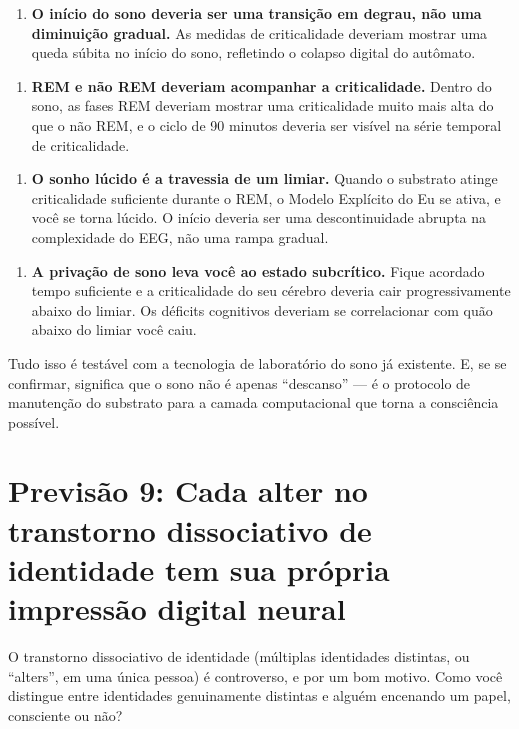 \documentclass[11pt, twoside, openright]{book}
\begin{document}
\begin{enumerate}
  \item \textbf{O início do sono deveria ser uma transição em degrau, não uma diminuição gradual.} As medidas de criticalidade deveriam mostrar uma queda súbita no início do sono, refletindo o colapso digital do autômato.
\end{enumerate}

\begin{enumerate}
  \item \textbf{REM e não REM deveriam acompanhar a criticalidade.} Dentro do sono, as fases REM deveriam mostrar uma criticalidade muito mais alta do que o não REM, e o ciclo de 90 minutos deveria ser visível na série temporal de criticalidade.
\end{enumerate}

\begin{enumerate}
  \item \textbf{O sonho lúcido é a travessia de um limiar.} Quando o substrato atinge criticalidade suficiente durante o REM, o Modelo Explícito do Eu se ativa, e você se torna lúcido. O início deveria ser uma descontinuidade abrupta na complexidade do EEG, não uma rampa gradual.
\end{enumerate}

\begin{enumerate}
  \item \textbf{A privação de sono leva você ao estado subcrítico.} Fique acordado tempo suficiente e a criticalidade do seu cérebro deveria cair progressivamente abaixo do limiar. Os déficits cognitivos deveriam se correlacionar com quão abaixo do limiar você caiu.
\end{enumerate}

Tudo isso é testável com a tecnologia de laboratório do sono já existente. E, se se confirmar, significa que o sono não é apenas ``descanso'' --- é o protocolo de manutenção do substrato para a camada computacional que torna a consciência possível.

\section*{Previsão 9: Cada alter no transtorno dissociativo de identidade tem sua própria impressão digital neural}

O transtorno dissociativo de identidade (múltiplas identidades distintas, ou ``alters'', em uma única pessoa) é controverso, e por um bom motivo. Como você distingue entre identidades genuinamente distintas e alguém encenando um papel, consciente ou não?
\end{document}
